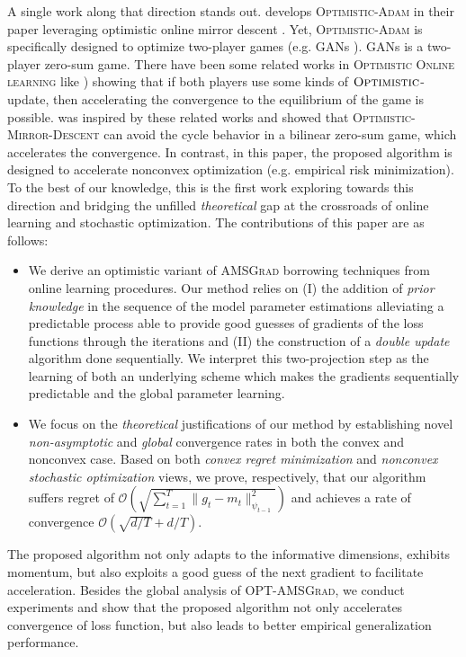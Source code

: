\documentclass[11pt]{article}
\theoremstyle{k}
\begin{document}
A single work along that direction stands out. \citep{DISZ18} develops \textsc{Optimistic-Adam} in their paper leveraging optimistic online mirror descent \citep{RS13b}.
Yet, \textsc{Optimistic-Adam} is specifically designed to optimize two-player games (e.g. GANs \citep{goodfellow2014generative}).
GANs is a two-player zero-sum game. There have been some related works in \textsc{Optimistic Online learning} like \citep{CJ12,RS13b,SALS15}) showing that if both players use some kinds of $\textsc{Optimistic}$-update, then accelerating the convergence to the equilibrium of the game is possible.
\citep{DISZ18} was inspired by these related works and showed that \textsc{Optimistic-Mirror-Descent} can avoid the cycle behavior in a bilinear zero-sum game, which accelerates the convergence. 
In contrast, in this paper, the proposed algorithm is designed to accelerate nonconvex optimization (e.g. empirical risk minimization).
To the best of our knowledge, this is the first work exploring towards this direction and bridging the unfilled \emph{theoretical} gap at the crossroads of online learning and stochastic optimization.
The contributions of this paper are as follows:
\begin{itemize}
\item We derive an optimistic variant of \textsc{AMSGrad} borrowing techniques from online learning procedures. Our method relies on \textsf{(I)} the addition of \emph{prior knowledge} in the sequence of the model parameter estimations alleviating a predictable process able to provide good guesses of gradients of the loss functions through the iterations and \textsf{(II)} the construction of a \emph{double update} algorithm done sequentially. We interpret this two-projection step as the learning of both an underlying scheme which makes the gradients sequentially predictable and the global parameter learning.
\item We focus on the  \emph{theoretical} justifications of our method by establishing novel \emph{non-asymptotic} and \emph{global} convergence rates in both the convex and nonconvex case.  Based on both \emph{convex regret minimization} and \emph{nonconvex stochastic optimization} views, we prove, respectively, that our algorithm suffers regret of $\mathcal{O}(\sqrt{\sum_{t=1}^T \| g_t - m_t  \|^2_{\psi_{t-1}}})$ and achieves a rate of convergence $\mathcal{O}\left(\sqrt{d/T} +d/T \right)$.
\end{itemize}
The proposed algorithm not only adapts to the informative dimensions, exhibits momentum, but also exploits a good guess of the next gradient to facilitate acceleration. 
Besides the global analysis of \textsc{OPT-AMSGrad}, we conduct experiments and show that the proposed algorithm not only accelerates convergence of loss function, but also leads to better empirical generalization performance.
\end{document}
